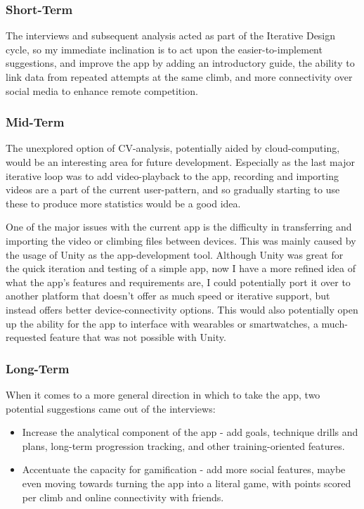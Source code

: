 \subsubsection{Short-Term}
The interviews and subsequent analysis acted as part of the Iterative Design cycle, so my immediate inclination is to act upon the easier-to-implement suggestions, and improve the app by adding an introductory guide, the ability to link data from repeated attempts at the same climb, and more connectivity over social media to enhance remote competition.


\subsubsection{Mid-Term}
The unexplored option of CV-analysis, potentially aided by cloud-computing, would be an interesting area for future development.
Especially as the last major iterative loop was to add video-playback to the app, recording and importing videos are a part of the current user-pattern, and so gradually starting to use these to produce more statistics would be a good idea.

One of the major issues with the current app is the difficulty in transferring and importing the video or climbing files between devices.
This was mainly caused by the usage of Unity as the app-development tool.
Although Unity was great for the quick iteration and testing of a simple app, now I have a more refined idea of what the app's features and requirements are, I could potentially port it over to another platform that doesn't offer as much speed or iterative support, but instead offers better device-connectivity options.
This would also potentially open up the ability for the app to interface with wearables or smartwatches, a much-requested feature that was not possible with Unity.


\subsubsection{Long-Term}
When it comes to a more general direction in which to take the app, two potential suggestions came out of the interviews:
\begin{itemize}
    \item Increase the analytical component of the app - add goals, technique drills and plans, long-term progression tracking, and other training-oriented features.
    \item Accentuate the capacity for gamification - add more social features, maybe even moving towards turning the app into a literal game, with points scored per climb and online connectivity with friends.
\end{itemize}




